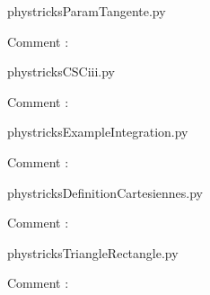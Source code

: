 
    \newcommand{\CaptionFigParamTangente}{<+Type your caption here+>}
    \begin{center}
        
    \end{center}
    phystricksParamTangente.py

    Comment : 

    \clearpage
    


    \newcommand{\CaptionFigCSCiii}{<+Type your caption here+>}
    \begin{center}
        
    \end{center}
    phystricksCSCiii.py

    Comment : 

    \clearpage
    


    \newcommand{\CaptionFigExampleIntegration}{<+Type your caption here+>}
    \begin{center}
        
    \end{center}
    phystricksExampleIntegration.py

    Comment : 

    \clearpage
    


    \newcommand{\CaptionFigDefinitionCartesiennes}{<+Type your caption here+>}
    \begin{center}
        
    \end{center}
    phystricksDefinitionCartesiennes.py

    Comment : 

    \clearpage
    


    \newcommand{\CaptionFigTriangleRectangle}{<+Type your caption here+>}
    \begin{center}
        
    \end{center}
    phystricksTriangleRectangle.py

    Comment : 

    \clearpage
    


